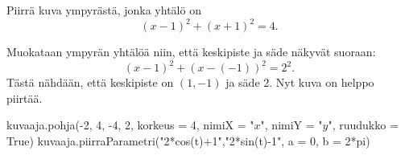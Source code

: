 


\begin{esimerkki}
Piirrä kuva ympyrästä, jonka yhtälö on
\[
(x-1)^2+(x+1)^2=4.
\]
\begin{esimratk}
Muokataan ympyrän yhtälöä niin, että keskipiste ja säde näkyvät suoraan:
\[
(x-1)^2+(x-(-1))^2=2^2.
\]
Tästä nähdään, että keskipiste on $(1, -1)$ ja säde 2. Nyt kuva on helppo piirtää.

\begin{kuva}
    kuvaaja.pohja(-2, 4, -4, 2, korkeus = 4, nimiX = "$x$", nimiY = "$y$", ruudukko = True)
    kuvaaja.piirraParametri("2*cos(t)+1","2*sin(t)-1", a = 0, b = 2*pi)
\end{kuva}

\end{esimratk}
\end{esimerkki}




